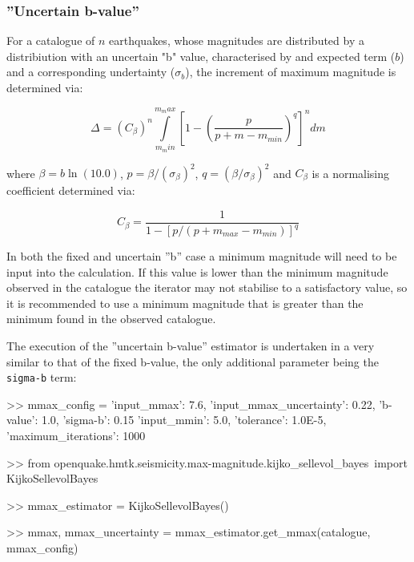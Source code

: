 \subsubsection{''Uncertain b-value''}

For a catalogue of $n$ earthquakes, whose magnitudes are distributed by a \textcite{GutenbergRichter1944} distribiution with an uncertain "b" value, characterised by and expected term ($b$) and a corresponding undertainty ($\sigma_b$), the increment of maximum magnitude is determined via:


\begin{equation}
\Delta = \left( {C_{\beta}} \right)^n \int\limits_{m_min}^{m_max} \left[ {1 - \left( {\frac{p}{p + m - m_{min}}} \right) ^q} \right]^n dm
\end{equation}

where $\beta = b \ln \left( {10.0} \right)$, $p = \beta / \left( {\sigma_{\beta}} \right) ^ 2$, $q = \left( {\beta / \sigma_{\beta}} \right) ^ 2$ and $C_{\beta}$ is a normalising coefficient determined via:

\begin{equation}
C_{\beta} = \frac{1}{1 - \left[ {p / \left( {p + m_{max} - m_{min}} \right) } \right]^q}
\end{equation}

In both the fixed and uncertain ''b'' case a minimum magnitude will need to be input into the calculation. If this value is lower than the minimum magnitude observed in the catalogue the iterator may not stabilise to a satisfactory value, so it is recommended to use a minimum magnitude that is greater than the minimum found in the observed catalogue.

The execution of the ''uncertain b-value'' estimator is undertaken in a very similar to that of the fixed b-value, the only additional parameter being the \verb=sigma-b= term:

\begin{python}[frame=single]
>> mmax_config = {'input_mmax': 7.6,
                  'input_mmax_uncertainty': 0.22,
                  'b-value': 1.0,
                  'sigma-b': 0.15
                  'input_mmin': 5.0,
                  'tolerance': 1.0E-5, 
                  'maximum_iterations': 1000}
                       
>> from openquake.hmtk.seismicity.max-magnitude.kijko_sellevol_bayes\
    import KijkoSellevolBayes

>> mmax_estimator = KijkoSellevolBayes()

>> mmax, mmax_uncertainty = mmax_estimator.get_mmax(catalogue,
                                                    mmax_config)
\end{python}

